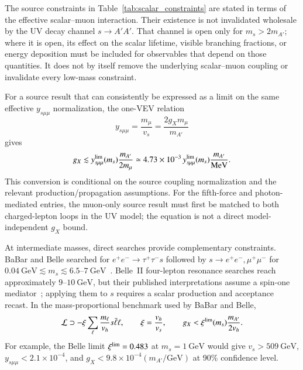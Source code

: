 \documentclass[onecolumn, aps, nofootinbib, prd, preprint, floats, floatfix, amsmath, amssymb, superscriptaddress, preprintnumbers]{revtex4-2}
\begin{document}
The source constraints in Table~\ref{tab:scalar_constraints} are stated in terms of the effective scalar--muon interaction. Their existence is not invalidated wholesale by the UV decay channel $s\to A'A'$. That channel is open only for $m_s>2m_{A'}$; where it is open, its effect on the scalar lifetime, visible branching fractions, or energy deposition must be included for observables that depend on those quantities. It does not by itself remove the underlying scalar--muon coupling or invalidate every low-mass constraint.

For a source result that can consistently be expressed as a limit on the same effective $y_{s\mu\mu}$ normalization, the one-VEV relation
\[
y_{s\mu\mu}=\frac{m_\mu}{v_s}=\frac{2g_Xm_\mu}{m_{A'}}
\]
gives
\begin{equation}
g_X\lesssim y_{s\mu\mu}^{\rm lim}(m_s)\frac{m_{A'}}{2m_\mu}
\simeq4.73\times10^{-3}\,y_{s\mu\mu}^{\rm lim}(m_s)
\frac{m_{A'}}{\mathrm{MeV}}.
\label{eq:scalar-limit-to-gx}
\end{equation}
This conversion is conditional on the source coupling normalization and the relevant production/propagation assumptions. For the fifth-force and photon-mediated entries, the muon-only source result must first be matched to both charged-lepton loops in the UV model; the equation is not a direct model-independent $g_X$ bound.



At intermediate masses, direct searches provide complementary constraints. BaBar and Belle searched for $e^+e^-\to\tau^+\tau^-s$ followed by $s\to e^+e^-,\mu^+\mu^-$ for $0.04~\mathrm{GeV}\lesssim m_s\lesssim6.5$--$7~\mathrm{GeV}$~\cite{BaBar:2020jma,Belle:2022gbl}. Belle~II four-lepton resonance searches reach approximately $9$--$10~\mathrm{GeV}$, but their published interpretations assume a spin-one mediator~\cite{Belle-II:2024wtd,Belle-II:2023ydz}; applying them to $s$ requires a scalar production and acceptance recast. In the mass-proportional benchmark used by BaBar and Belle,
\begin{equation}
\mathcal L\supset-\xi\sum_\ell\frac{m_\ell}{v_h}s\bar\ell\ell,
\qquad
\xi=\frac{v_h}{v_s},
\qquad
g_X<\xi^{\rm lim}(m_s)\frac{m_{A'}}{2v_h}.
\label{eq:scalar-collider-map}
\end{equation}
For example, the Belle limit $\xi^{\rm lim}=0.483$ at $m_s=1~\mathrm{GeV}$ would give $v_s>509~\mathrm{GeV}$, $y_{s\mu\mu}<2.1\times10^{-4}$, and $g_X<9.8\times10^{-4}(m_{A'}/\mathrm{GeV})$ at 90\% confidence level.
\end{document}
